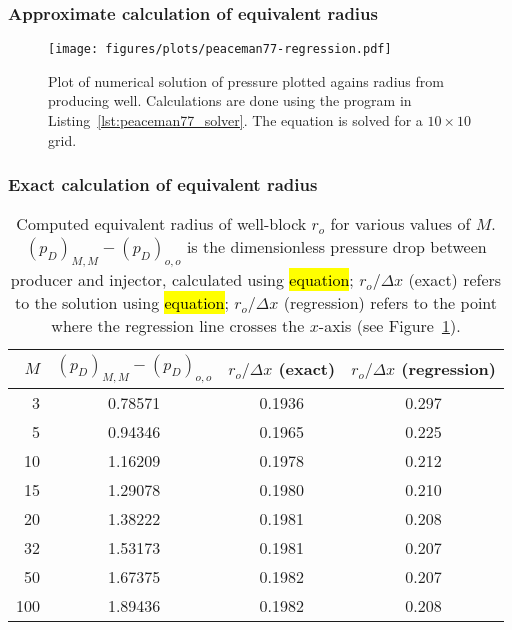 \subsubsection{Approximate calculation of equivalent radius} %
\label{ssub:approximate_calculation_of_equivalent_radius}


\begin{figure}[htbp]
    \centering
    \texttt{[image: figures/plots/peaceman77-regression.pdf]}
    \caption{Plot of numerical solution of pressure plotted agains radius from producing well. Calculations are done using the program in Listing~\ref{lst:peaceman77_solver}. The equation is solved for a $10\times 10$ grid.}
    \label{fig:peaceman77_pressure_vs_radius}
\end{figure}


\subsubsection{Exact calculation of equivalent radius} %
\label{ssub:exact_calculation_of_equivalent_radius}


\begin{table}
    \centering
    \caption{Computed equivalent radius of well-block $r_o$ for various values of $M$. $(p_D)_{M,M} - (p_D)_{o,o}$ is the dimensionless pressure drop between producer and injector, calculated using \hl{equation}; $r_o/\Delta x$ (exact) refers to the solution using \hl{equation}; $r_o / \Delta x$ (regression) refers to the point where the regression line crosses the $x$-axis (see Figure~\ref{fig:peaceman77_pressure_vs_radius}).}
    \begin{tabular}{rccc}
        \toprule
        $M$ & $(p_D)_{M,M} - (p_D)_{o,o}$ & $r_o/\Delta x$ (exact) & $r_o / \Delta x$ (regression)\\
        \midrule
        3   & 0.78571 & 0.1936 & 0.297 \\
        5   & 0.94346 & 0.1965 & 0.225 \\
        10  & 1.16209 & 0.1978 & 0.212 \\
        15  & 1.29078 & 0.1980 & 0.210 \\
        20  & 1.38222 & 0.1981 & 0.208 \\
        32  & 1.53173 & 0.1981 & 0.207 \\
        50  & 1.67375 & 0.1982 & 0.207 \\
        100 & 1.89436 & 0.1982 & 0.208 \\
        \bottomrule
    \end{tabular}
    \label{tbl:label}
\end{table}


